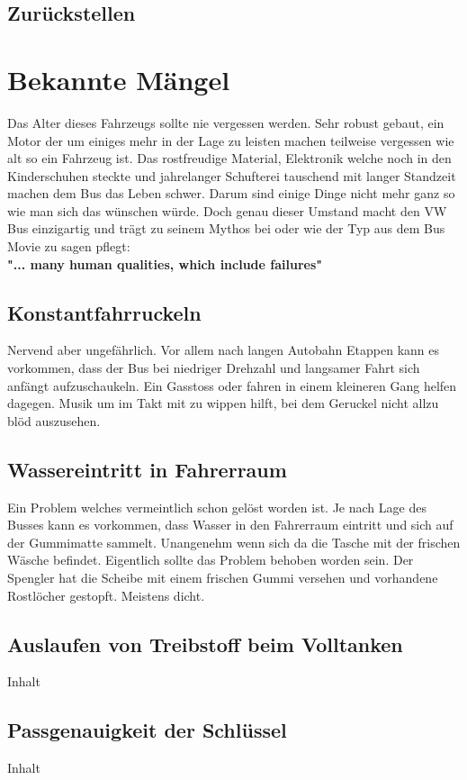 \subsection{Zurückstellen}
\newpage
\section{Bekannte Mängel}
Das Alter dieses Fahrzeugs sollte nie vergessen werden. Sehr robust gebaut, ein Motor der um einiges mehr in der Lage zu leisten machen teilweise vergessen wie alt so ein Fahrzeug ist.
Das rostfreudige Material, Elektronik welche noch in den Kinderschuhen steckte und jahrelanger Schufterei tauschend mit langer Standzeit machen dem Bus das Leben schwer. 
Darum sind einige Dinge nicht mehr ganz so wie man sich das wünschen würde.
Doch genau dieser Umstand macht den VW Bus einzigartig und trägt zu seinem Mythos bei oder wie der Typ aus dem Bus Movie zu sagen pflegt:\\ \textbf{"... many human qualities, which include failures"}

\subsection{Konstantfahrruckeln}
Nervend aber ungefährlich.
Vor allem nach langen Autobahn Etappen kann es vorkommen, dass der Bus bei niedriger Drehzahl und langsamer Fahrt sich anfängt aufzuschaukeln.
Ein Gasstoss oder fahren in einem kleineren Gang helfen dagegen. Musik um im Takt mit zu wippen hilft, bei dem Geruckel nicht allzu blöd auszusehen.

\subsection{Wassereintritt in Fahrerraum}
Ein Problem welches vermeintlich schon gelöst worden ist. Je nach Lage des Busses kann es vorkommen, dass Wasser in den Fahrerraum eintritt und sich auf der Gummimatte sammelt. 
Unangenehm wenn sich da die Tasche mit der frischen Wäsche befindet. 
Eigentlich sollte das Problem behoben worden sein. 
Der Spengler hat die Scheibe mit einem frischen Gummi versehen und vorhandene Rostlöcher gestopft.
Meistens dicht.

\subsection{Auslaufen von Treibstoff beim Volltanken}
Inhalt

\subsection{Passgenauigkeit der Schlüssel}
Inhalt
\newpage
